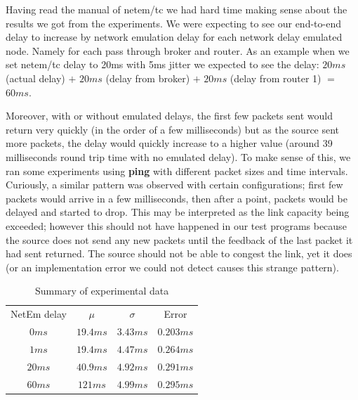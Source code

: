 \documentclass[conference]{IEEEtran}
\begin{document}
Having read the manual of netem/tc we had hard time making sense about the results we got from the experiments. We were expecting to see our end-to-end delay to increase by network emulation delay for each network delay emulated node. Namely for each pass through broker and router. As an example when we set netem/tc delay to 20ms with 5ms jitter we expected to see the delay: $20ms$ (actual delay) $+$ $20ms$ (delay from broker) $+$ $20ms$ (delay from router 1) $=$ $60ms$.

Moreover, with or without emulated delays, the first few packets sent would return
very quickly (in the order of a few milliseconds) but as the source sent more packets,
the delay would quickly increase to a higher value (around 39 milliseconds round trip time with no
emulated delay). To make sense of this, we ran some experiments using \textbf{ping}
with different packet sizes and time intervals. Curiously, a similar pattern was observed
with certain configurations; first few packets would arrive in a few milliseconds, then
after a point, packets would be delayed and started to drop. This may be interpreted
as the link capacity being exceeded; however this should not have happened in our test programs
because the source does not send any new packets until the feedback of the last packet it had sent
returned. The source should not be able to congest the link, yet it does
(or an implementation error we could not detect causes this strange pattern).

\begin{table}
    \centering
    \begin{tabular}{c c c c}
        \toprule
        NetEm delay & $\mu$ & $\sigma$ & Error \\
        $0ms$   &    $19.4ms$   &   $3.43ms$    &   $0.203ms$ \\
        $1ms$   &    $19.4ms$   &   $4.47ms$    &   $0.264ms$ \\
        $20ms$   &    $40.9ms$   &   $4.92ms$    &   $0.291ms$ \\
        $60ms$   &    $121ms$   &   $4.99ms$    &   $0.295ms$ \\
        \bottomrule
    \end{tabular}\label{table:data} \\
    \caption{Summary of experimental data}\label{table:data}
\end{table}
\end{document}
